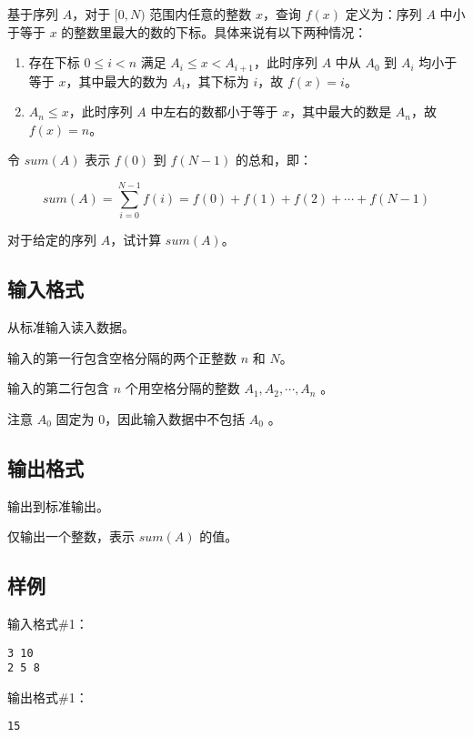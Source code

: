 \documentclass[cn,10pt,math=newtx,citestyle=gb7714-2015,bibstyle=gb7714-2015]{elegantbook}
\begin{document}
基于序列 $A$，对于 $[0,N)$ 范围内任意的整数 $x$，查询 $f(x)$ 定义为：序列 $A$ 中{\heiti 小于等于} $x$ 的整数里最大的数的{\heiti 下标}。具体来说有以下两种情况：

\begin{enumerate}
  \item 存在下标 $0\le i<n$ 满足 $A_i\le x < A_{i+1}$，此时序列 $A$ 中从 $A_0$ 到 $A_i$ 均小于等于 $x$，其中最大的数为 $A_i$，其下标为 $i$，故 $f(x)=i$。
  \item $A_n\le x$，此时序列 $A$ 中左右的数都小于等于 $x$，其中最大的数是 $A_n$，故 $f(x)=n$。
\end{enumerate}

令 $sum(A)$ 表示 $f(0)$ 到 $f(N-1)$ 的总和，即：

\begin{equation*}
sum(A) = \sum_{i=0}^{N-1} {f(i)=f(0)+f(1)+f(2)+\cdots +f(N-1)}
\end{equation*}

对于给定的序列 $A$，试计算 $sum(A)$。

\subsection*{输入格式}

从标准输入读入数据。

输入的第一行包含空格分隔的两个正整数 $n$ 和 $N$。

输入的第二行包含 $n$ 个用空格分隔的整数 $A_1,A_2,\cdots,A_n$
。

注意 $A_0$
 固定为 $0$，因此输入数据中不包括 $A_0$ 
。

\subsection*{输出格式}

输出到标准输出。

仅输出一个整数，表示 $sum(A)$ 的值。

\subsection*{样例}

输入格式\#1：

\begin{lstlisting}
3 10
2 5 8
\end{lstlisting}

输出格式\#1：

\begin{lstlisting}
15
\end{lstlisting}
\end{document}
